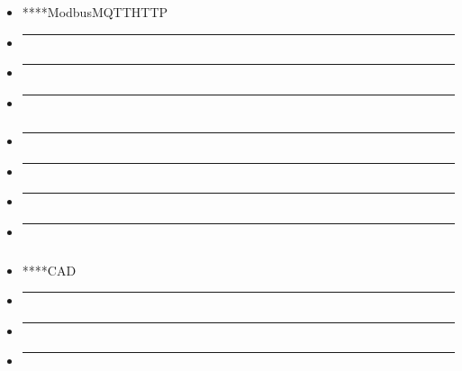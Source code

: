 \subsubsection{}\label{section-8}

\begin{itemize}
\item
  ****ModbusMQTTHTTP
\item
  \begin{center}\rule{0.5\linewidth}{0.5pt}\end{center}
\item
  \begin{center}\rule{0.5\linewidth}{0.5pt}\end{center}
\item
  \begin{center}\rule{0.5\linewidth}{0.5pt}\end{center}
\end{itemize}

\subsubsection{}\label{section-9}

\begin{itemize}
\item
  \begin{center}\rule{0.5\linewidth}{0.5pt}\end{center}
\item
  \begin{center}\rule{0.5\linewidth}{0.5pt}\end{center}
\item
  \begin{center}\rule{0.5\linewidth}{0.5pt}\end{center}
\item
  \begin{center}\rule{0.5\linewidth}{0.5pt}\end{center}
\end{itemize}

\subsubsection{}\label{section-10}

\begin{itemize}
\item
  ****CAD
\item
  \begin{center}\rule{0.5\linewidth}{0.5pt}\end{center}
\item
  \begin{center}\rule{0.5\linewidth}{0.5pt}\end{center}
\item
  \begin{center}\rule{0.5\linewidth}{0.5pt}\end{center}
\end{itemize}

